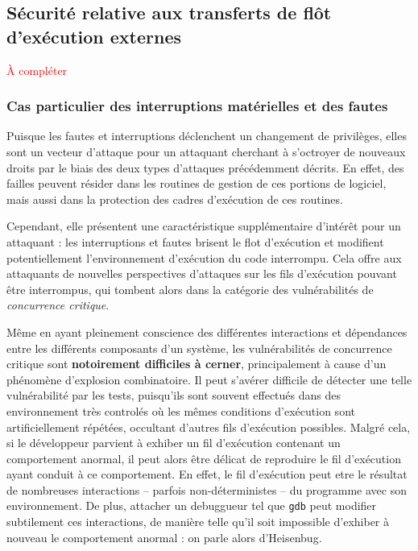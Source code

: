 		\subsection{Sécurité relative aux transferts de flôt d'exécution externes}

		\textcolor{red}{À compléter}

		\subsubsection{Cas particulier des interruptions matérielles et des fautes}

Puisque les fautes et interruptions déclenchent un changement de privilèges, elles sont un vecteur d'attaque pour un attaquant cherchant à s'octroyer de nouveaux droits par le biais des deux types d'attaques précédemment décrits. En effet, des failles peuvent résider dans les routines de gestion de ces portions de logiciel, mais aussi dans la protection des cadres d'exécution de ces routines. 

Cependant, elle présentent une caractéristique supplémentaire d'intérêt pour un attaquant : les interruptions et fautes brisent le flot d'exécution et modifient potentiellement l'environnement d'exécution du code interrompu. Cela offre aux attaquants de nouvelles perspectives d'attaques sur les fils d'exécution pouvant être interrompus, qui tombent alors dans la catégorie des vulnérabilités de \emph{concurrence critique}.

Même en ayant pleinement conscience des différentes interactions et dépendances entre les différents composants d'un système, les vulnérabilités de concurrence critique sont \textbf{notoirement difficiles à cerner}, principalement à cause d'un phénomène d'explosion combinatoire. Il peut s'avérer difficile de détecter une telle vulnérabilité par les tests, puisqu'ils sont souvent effectués dans des environnement très controlés où les mêmes conditions d'exécution sont artificiellement répétées, occultant d'autres fils d'exécution possibles. Malgré cela, si le développeur parvient à exhiber un fil d'exécution contenant un comportement anormal, il peut alors être délicat de reproduire le fil d'exécution ayant conduit à ce comportement. En effet, le fil d'exécution peut etre le résultat de nombreuses interactions -- parfois non-déterministes -- du programme avec son environnement. De plus, attacher un debuggueur tel que \texttt{gdb} peut modifier subtilement ces interactions, de manière telle qu'il soit impossible d'exhiber à nouveau le comportement anormal : on parle alors d'Heisenbug.

